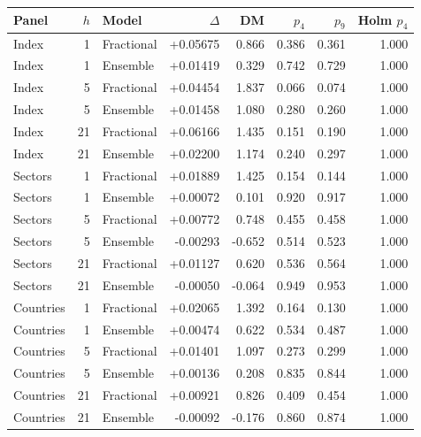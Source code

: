\begin{tabular}{lrlrrrrr}
\toprule
Panel & $h$ & Model & $\Delta$ & DM & $p_4$ & $p_9$ & Holm $p_4$ \\
\midrule
Index & 1 & Fractional & +0.05675 & 0.866 & 0.386 & 0.361 & 1.000 \\
Index & 1 & Ensemble & +0.01419 & 0.329 & 0.742 & 0.729 & 1.000 \\
Index & 5 & Fractional & +0.04454 & 1.837 & 0.066 & 0.074 & 1.000 \\
Index & 5 & Ensemble & +0.01458 & 1.080 & 0.280 & 0.260 & 1.000 \\
Index & 21 & Fractional & +0.06166 & 1.435 & 0.151 & 0.190 & 1.000 \\
Index & 21 & Ensemble & +0.02200 & 1.174 & 0.240 & 0.297 & 1.000 \\
Sectors & 1 & Fractional & +0.01889 & 1.425 & 0.154 & 0.144 & 1.000 \\
Sectors & 1 & Ensemble & +0.00072 & 0.101 & 0.920 & 0.917 & 1.000 \\
Sectors & 5 & Fractional & +0.00772 & 0.748 & 0.455 & 0.458 & 1.000 \\
Sectors & 5 & Ensemble & -0.00293 & -0.652 & 0.514 & 0.523 & 1.000 \\
Sectors & 21 & Fractional & +0.01127 & 0.620 & 0.536 & 0.564 & 1.000 \\
Sectors & 21 & Ensemble & -0.00050 & -0.064 & 0.949 & 0.953 & 1.000 \\
Countries & 1 & Fractional & +0.02065 & 1.392 & 0.164 & 0.130 & 1.000 \\
Countries & 1 & Ensemble & +0.00474 & 0.622 & 0.534 & 0.487 & 1.000 \\
Countries & 5 & Fractional & +0.01401 & 1.097 & 0.273 & 0.299 & 1.000 \\
Countries & 5 & Ensemble & +0.00136 & 0.208 & 0.835 & 0.844 & 1.000 \\
Countries & 21 & Fractional & +0.00921 & 0.826 & 0.409 & 0.454 & 1.000 \\
Countries & 21 & Ensemble & -0.00092 & -0.176 & 0.860 & 0.874 & 1.000 \\
\bottomrule
\end{tabular}
